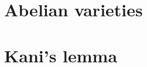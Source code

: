 \documentclass[12pt]{article}
\theoremstyle{plain}
\theoremstyle{definition}
\theoremstyle{remark}
\begin{document}
\section{Abelian varieties}

\section{Kani's lemma}
\end{document}
